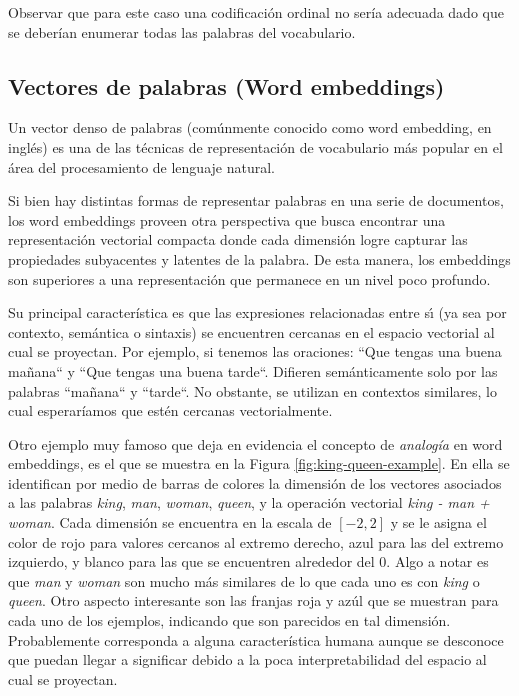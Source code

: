 Observar que para este caso una codificación ordinal no sería adecuada dado que
se deberían enumerar todas las palabras del vocabulario.

\subsection{Vectores de palabras (Word embeddings)}
\label{method:wb}

Un vector denso de palabras (comúnmente conocido como word embedding, en inglés)
es una de las técnicas de representación de vocabulario más popular en el área
del procesamiento de lenguaje natural.

Si bien hay distintas formas de representar palabras en una serie de documentos,
los word embeddings proveen otra perspectiva que busca encontrar una
representación vectorial compacta donde cada dimensión logre capturar las
propiedades subyacentes y latentes de la palabra. De esta manera, los embeddings
son superiores a una representación que permanece en un nivel poco profundo.

Su principal característica  es que las expresiones relacionadas entre sı́ (ya
sea por contexto, semántica o sintaxis) se encuentren cercanas en el espacio
vectorial al cual se proyectan. Por ejemplo, si tenemos las oraciones: ``Que
tengas una buena mañana`` y ``Que tengas una buena tarde``. Difieren
semánticamente solo por las palabras ``mañana`` y ``tarde``. No obstante, se
utilizan en contextos similares, lo cual esperaríamos que estén cercanas
vectorialmente.

Otro ejemplo muy famoso que deja en evidencia el concepto de \emph{analogía} en
word embeddings, es el que se muestra en la Figura \ref{fig:king-queen-example}.
En ella se identifican por medio de barras de colores la dimensión de los
vectores asociados a las palabras \emph{king}, \emph{man}, \emph{woman},
\emph{queen}, y la operación vectorial \emph{king - man + woman}. Cada dimensión
se encuentra en la escala de $[-2, 2]$ y se le asigna el color de rojo para
valores cercanos al extremo derecho, azul para las del extremo izquierdo, y
blanco para las que se encuentren alrededor del 0.  Algo a notar es que
\emph{man} y \emph{woman} son mucho más similares de lo que cada uno es con
\emph{king} o \emph{queen}. Otro aspecto interesante son las franjas roja y azúl
que se muestran para cada uno de los ejemplos, indicando que son parecidos en
tal dimensión. Probablemente corresponda a alguna característica humana aunque
se desconoce que puedan llegar a significar debido a la poca interpretabilidad
del espacio al cual se proyectan.


